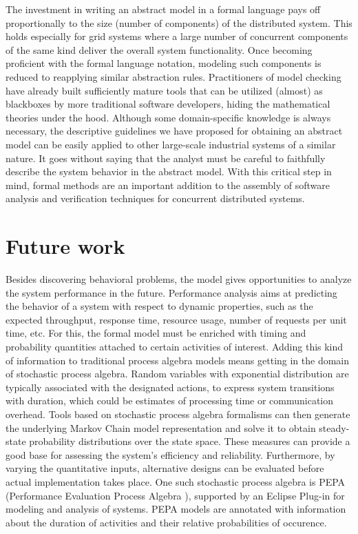 \documentclass[sort&compress,preprint,3p]{elsarticle}
\begin{document}
The investment in writing an abstract model in a formal language 
pays off proportionally to the size (number of components) of the distributed system. 
This holds especially for grid systems where a large number of concurrent
 components of the same kind deliver the overall system functionality. 
Once becoming proficient with
the formal language notation, modeling such components is
reduced to reapplying similar abstraction rules.
Practitioners
of model checking have already built sufficiently mature tools
that can be utilized (almost) as blackboxes by more traditional
software developers, hiding the mathematical theories under
the hood. Although some domain-specific knowledge is always necessary,
the descriptive guidelines we have proposed for obtaining
an abstract model can be easily 
applied to other large-scale industrial systems of a similar nature.
It goes without saying that the analyst must be careful to faithfully
describe the system behavior in the abstract model. With this critical step in mind, formal methods
are an important addition to the assembly of software analysis and verification techniques for concurrent distributed systems.
\section{Future work}
\label{sec:Section_6}
Besides discovering behavioral problems, the 
model gives opportunities to analyze the system performance in the future.
Performance analysis aims at predicting the behavior of a system with respect to dynamic properties, such as 
the expected throughput, response time, resource usage, number of requests per unit time, etc.
For this, the formal model must be enriched with timing and probability quantities attached 
to certain activities of interest.  Adding this kind of information to traditional process algebra models
means getting in the domain of stochastic process algebra. Random variables with exponential distribution are
typically associated with the designated actions, to express system transitions with duration, which could be estimates
of processing time or communication overhead. Tools based on stochastic process algebra formalisms can
then generate the underlying Markov Chain model representation and solve it to obtain steady-state probability distributions over the state space. These measures can provide a good base for assessing the system's efficiency and reliability. 
Furthermore, by varying the quantitative inputs, alternative designs can be evaluated before actual implementation
takes place. One such stochastic process algebra is PEPA (Performance Evaluation Process Algebra \cite{PEPA}), supported
by an Eclipse Plug-in for modeling and analysis of systems. 
PEPA models are annotated with information about the duration of activities and their relative probabilities of occurence.
\end{document}
